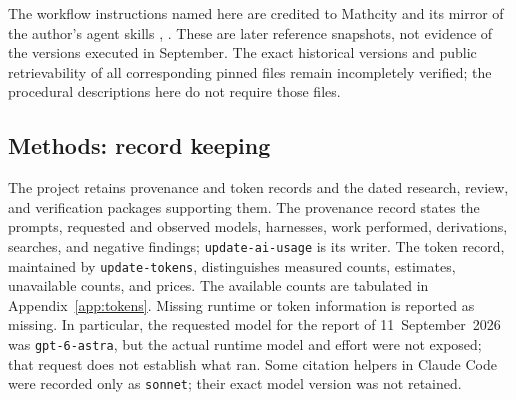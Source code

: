 \documentclass[11pt]{amsart}
\theoremstyle{plain}
\theoremstyle{definition}
\theoremstyle{remark}
\numberwithin{equation}{section}
\begin{document}
The workflow instructions named here are credited to Mathcity and its
mirror of the author's agent skills
\cite[\href{https://github.com/tdupu/mathcity/tree/0205e0adfb8963a843c28616fcedceafc7ca5680/subdomains/latex}
{LaTeX workflows}]{Dupuy2026mathcity},
\cite[\href{https://github.com/tdupu/mathcity/blob/c87fb990708ba1e8493133c6a8f17877004444c1/docs/agent-skills-mirror.md}
{workflow mirror}]{Dupuy2026skills}.
These are later reference snapshots, not evidence of the versions
executed in September. The exact historical versions and public
retrievability of all corresponding pinned files remain incompletely
verified; the procedural descriptions here do not require those files.

\subsection{Methods: record keeping}
The project retains provenance and token records and the dated research,
review, and verification packages supporting them. The provenance record
states the prompts, requested and observed models, harnesses, work
performed, derivations, searches, and negative findings;
\nolinkurl{update-ai-usage} is its writer. The token record, maintained by
\nolinkurl{update-tokens}, distinguishes measured counts, estimates,
unavailable counts, and prices. The available counts are tabulated in
Appendix~\ref{app:tokens}.
Missing runtime or token information is
reported as missing. In particular, the requested model for the report
of 11~September~2026 was \nolinkurl{gpt-6-astra}, but the actual runtime model
and effort were not exposed; that request does not establish what ran.
Some citation helpers in Claude Code were recorded only as
\nolinkurl{sonnet}; their exact model version was not retained.
\end{document}
